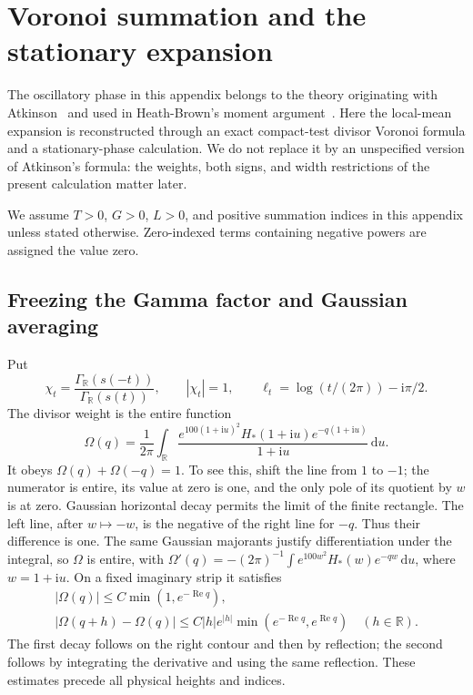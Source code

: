 \documentclass[11pt,a4paper]{article}
\numberwithin{equation}{section}
\theoremstyle{definition}
\newcommand{\R}{\mathbb R}
\newcommand{\dd}{\,\mathrm d}
\newcommand{\ii}{\mathrm i}
\newcommand{\Rea}{\operatorname{Re}}
\begin{document}
\section{Voronoi summation and the stationary expansion}
\label{sec:atkinson}
The oscillatory phase in this appendix belongs to the theory originating
with Atkinson~\cite{atkinson} and used in Heath-Brown's moment argument~\cite{hb78}.
Here the local-mean expansion is reconstructed through an exact compact-test
divisor Voronoi formula and a stationary-phase calculation. We do not replace
it by an unspecified version of Atkinson's formula: the weights, both signs,
and width restrictions of the present calculation matter later.

We assume $T>0$, $G>0$, $L>0$, and positive summation indices in
this appendix unless stated otherwise. Zero-indexed terms containing
negative powers are assigned the value zero.

\subsection{Freezing the Gamma factor and Gaussian averaging}
Put
\[
 \chi_t=\frac{\Gamma_{\R}(s(-t))}{\Gamma_{\R}(s(t))},\qquad |\chi_t|=1,
 \qquad\ell_t=\log(t/(2\pi))-\ii\pi/2.
\]
The divisor weight is the entire function
\begin{equation*}
 \Omega(q)=\frac1{2\pi}\int_{\R}
       \frac{e^{100(1+\ii u)^2}H_*(1+\ii u)e^{-q(1+\ii u)}}{1+\ii u}\dd u.
\end{equation*}
It obeys $\Omega(q)+\Omega(-q)=1$. To see this, shift the line from $1$ to $-1$;
the numerator is entire, its value at zero is one, and the only pole of its
quotient by $w$ is at zero. Gaussian horizontal decay permits the limit of the
finite rectangle. The left line, after $w\mapsto-w$, is the negative of the
right line for $-q$. Thus their difference is one. The same Gaussian majorants
justify differentiation under the integral, so $\Omega$ is entire, with
$\Omega'(q)=-(2\pi)^{-1}\int e^{100w^2}H_*(w)e^{-qw}\dd u$,
where $w=1+\ii u$.
On a fixed imaginary strip it satisfies
\begin{gather*}
 |\Omega(q)|\le C\min(1,e^{-\Rea q}),\\
 |\Omega(q+h)-\Omega(q)|\le C|h|e^{|h|}\min(e^{-\Rea q},e^{\Rea q})
 \quad(h\in\R).
\end{gather*}
The first decay follows on the right contour and then by reflection;
the second follows by integrating the derivative and using the same
reflection. These estimates precede all physical heights and indices.
\end{document}
